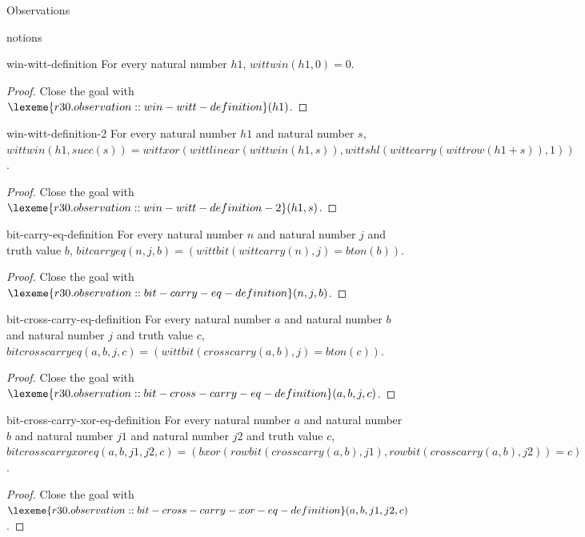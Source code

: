 \begin{lexlean}{Observations}
\begin{section}{notions}
\begin{lemma}{win-witt-definition}
For every natural number \(h1\), \(wittwin(h1, 0) = 0\).
\begin{proof}
Close the goal with \(\lexeme{r30.observation::win-witt-definition}(h1)\).
\end{proof}
\end{lemma}

\begin{lemma}{win-witt-definition-2}
For every natural number \(h1\) and natural number \(s\), \(wittwin(h1, succ(s)) = wittxor(wittlinear(wittwin(h1, s)), wittshl(wittcarry(wittrow(h1 + s)), 1))\).
\begin{proof}
Close the goal with \(\lexeme{r30.observation::win-witt-definition-2}(h1, s)\).
\end{proof}
\end{lemma}

\begin{lemma}{bit-carry-eq-definition}
For every natural number \(n\) and natural number \(j\) and truth value \(b\), \(bitcarryeq(n, j, b) = (wittbit(wittcarry(n), j) = bton(b))\).
\begin{proof}
Close the goal with \(\lexeme{r30.observation::bit-carry-eq-definition}(n, j, b)\).
\end{proof}
\end{lemma}

\begin{lemma}{bit-cross-carry-eq-definition}
For every natural number \(a\) and natural number \(b\) and natural number \(j\) and truth value \(c\), \(bitcrosscarryeq(a, b, j, c) = (wittbit(crosscarry(a, b), j) = bton(c))\).
\begin{proof}
Close the goal with \(\lexeme{r30.observation::bit-cross-carry-eq-definition}(a, b, j, c)\).
\end{proof}
\end{lemma}

\begin{lemma}{bit-cross-carry-xor-eq-definition}
For every natural number \(a\) and natural number \(b\) and natural number \(j1\) and natural number \(j2\) and truth value \(c\), \(bitcrosscarryxoreq(a, b, j1, j2, c) = (bxor(rowbit(crosscarry(a, b), j1), rowbit(crosscarry(a, b), j2)) = c)\).
\begin{proof}
Close the goal with \(\lexeme{r30.observation::bit-cross-carry-xor-eq-definition}(a, b, j1, j2, c)\).
\end{proof}
\end{lemma}


\end{section}
\end{lexlean}

